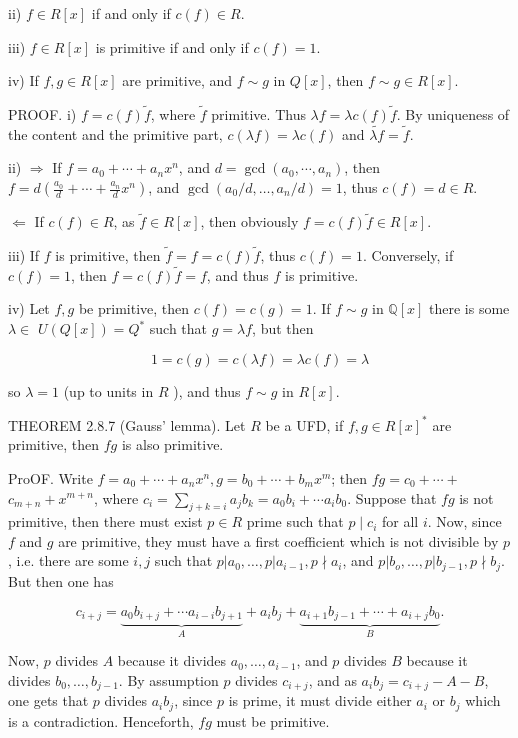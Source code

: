 ii) $f \in R[x]$ if and only if $c(f) \in R$.

iii) $f \in R[x]$ is primitive if and only if $c(f)=1$.

iv) If $f, g \in R[x]$ are primitive, and $f \sim g$ in $Q[x]$, then $f \sim g \in R[x]$.

PROOF. i) $f=c(f) \tilde{f}$, where $\tilde{f}$ primitive. Thus $\lambda f=\lambda c(f) \tilde{f}$. By uniqueness of the content and the primitive part, $c(\lambda f)=\lambda c(f)$ and $\widetilde{\lambda f}=\tilde{f}$.

ii) $\Rightarrow$ If $f=a_{0}+\cdots+a_{n} x^{n}$, and $d=\operatorname{gcd}\left(a_{0}, \cdots, a_{n}\right)$, then $f=d\left(\frac{a_{0}}{d}+\cdots+\frac{a_{n}}{d} x^{n}\right)$, and $\operatorname{gcd}\left(a_{0} / d, \ldots, a_{n} / d\right)=1$, thus $c(f)=d \in R$.

$\Leftarrow$ If $c(f) \in R$, as $\tilde{f} \in R[x]$, then obviously $f=c(f) \tilde{f} \in R[x]$.

iii) If $f$ is primitive, then $\tilde{f}=f=c(f) \tilde{f}$, thus $c(f)=1$. Conversely, if $c(f)=1$, then $f=c(f) \tilde{f}=f$, and thus $f$ is primitive.

iv) Let $f, g$ be primitive, then $c(f)=c(g)=1$. If $f \sim g$ in $\mathbb{Q}[x]$ there is some $\lambda \in$ $U(Q[x])=Q^{*}$ such that $g=\lambda f$, but then

$$
1=c(g)=c(\lambda f)=\lambda c(f)=\lambda
$$

so $\lambda=1$ (up to units in $R$ ), and thus $f \sim g$ in $R[x]$.

THEOREM 2.8.7 (Gauss' lemma). Let $R$ be a UFD, if $f, g \in R[x]^{*}$ are primitive, then $f g$ is also primitive.

ProOF. Write $f=a_{0}+\cdots+a_{n} x^{n}, g=b_{0}+\cdots+b_{m} x^{m}$; then $f g=c_{0}+\cdots+$ $c_{m+n}+x^{m+n}$, where $c_{i}=\sum_{j+k=i} a_{j} b_{k}=a_{0} b_{i}+\cdots a_{i} b_{0}$. Suppose that $f g$ is not primitive, then there must exist $p \in R$ prime such that $p \mid c_{i}$ for all $i$. Now, since $f$ and $g$ are primitive, they must have a first coefficient which is not divisible by $p$, i.e. there are some $i, j$ such that $p\left|a_{0}, \ldots, p\right| a_{i-1}, p \nmid a_{i}$, and $p\left|b_{o}, \ldots, p\right| b_{j-1}, p \nmid b_{j}$. But then one has

$$
c_{i+j}=\underbrace{a_{0} b_{i+j}+\cdots a_{i-i} b_{j+1}}_{A}+a_{i} b_{j}+\underbrace{a_{i+1} b_{j-1}+\cdots+a_{i+j} b_{0}}_{B} .
$$

Now, $p$ divides $A$ because it divides $a_{0}, \ldots, a_{i-1}$, and $p$ divides $B$ because it divides $b_{0}, \ldots, b_{j-1}$. By assumption $p$ divides $c_{i+j}$, and as $a_{i} b_{j}=c_{i+j}-A-B$, one gets that $p$ divides $a_{i} b_{j}$, since $p$ is prime, it must divide either $a_{i}$ or $b_{j}$ which is a contradiction. Henceforth, $f g$ must be primitive.


